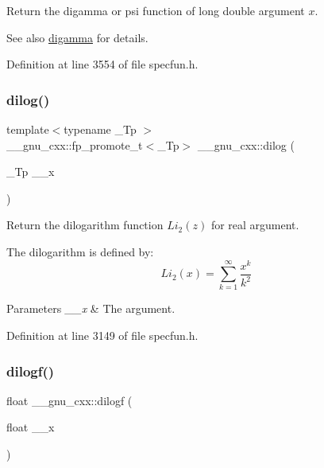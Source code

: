 Return the digamma or psi function of {\ttfamily long double} argument $ x $.

\begin{DoxySeeAlso}{See also}
\hyperlink{group__gnu__math__spec__func_ga7b87300edf8754d959e1d94fe0c9246e}{digamma} for details. 
\end{DoxySeeAlso}


Definition at line 3554 of file specfun.\+h.

\mbox{\label{group__gnu__math__spec__func_ga4185ee1a0f9189a18085f65d52b6bc9b}} 
\subsubsection{\texorpdfstring{dilog()}{dilog()}}
{\footnotesize\ttfamily template$<$typename \+\_\+\+Tp $>$ \\
\+\_\+\+\_\+gnu\+\_\+cxx\+::fp\+\_\+promote\+\_\+t$<$\+\_\+\+Tp$>$ \+\_\+\+\_\+gnu\+\_\+cxx\+::dilog (\begin{DoxyParamCaption}\item[{\+\_\+\+Tp}]{\+\_\+\+\_\+x }\end{DoxyParamCaption})\hspace{0.3cm}{\ttfamily [inline]}}

Return the dilogarithm function $ Li_2(z) $ for real argument.

The dilogarithm is defined by\+: \[ Li_2(x) = \sum_{k=1}^{\infty}\frac{x^k}{k^2} \]


\begin{DoxyParams}{Parameters}
{\em \+\_\+\+\_\+x} & The argument. \\
\hline
\end{DoxyParams}


Definition at line 3149 of file specfun.\+h.

\mbox{\label{group__gnu__math__spec__func_ga901091e0e7ce7d6113ae6a86f4865a92}} 
\subsubsection{\texorpdfstring{dilogf()}{dilogf()}}
{\footnotesize\ttfamily float \+\_\+\+\_\+gnu\+\_\+cxx\+::dilogf (\begin{DoxyParamCaption}\item[{float}]{\+\_\+\+\_\+x }\end{DoxyParamCaption})\hspace{0.3cm}{\ttfamily [inline]}}

